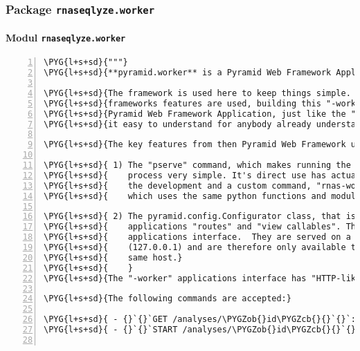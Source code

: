 \subsubsection{Package \texttt{rnaseqlyze.worker}}
\label{rnaseqlyze-pdf:package-rnaseqlyze-worker}

\paragraph{Modul \texttt{rnaseqlyze.worker}}
\label{rnaseqlyze-pdf:modul-rnaseqlyze-worker}
\begin{Verbatim}[commandchars=\\\{\},numbers=left,firstnumber=1,stepnumber=5]
\PYG{l+s+sd}{"""}
\PYG{l+s+sd}{**pyramid.worker** is a Pyramid Web Framework Application.}

\PYG{l+s+sd}{The framework is used here to keep things simple. Even thought not many of the}
\PYG{l+s+sd}{frameworks features are used, building this "-worker" part of the project as a}
\PYG{l+s+sd}{Pyramid Web Framework Application, just like the "-web" part, hopefullly makes}
\PYG{l+s+sd}{it easy to understand for anybody already understanding the "-web" part.}

\PYG{l+s+sd}{The key features from then Pyramid Web Framework used here, are}

\PYG{l+s+sd}{ 1) The "pserve" command, which makes running the application as a unix daemon}
\PYG{l+s+sd}{    process very simple. It's direct use has actually been depreciated during}
\PYG{l+s+sd}{    the development and a custom command, "rnas-worker", has been created,}
\PYG{l+s+sd}{    which uses the same python functions and modules like "pserve".}

\PYG{l+s+sd}{ 2) The pyramid.config.Configurator class, that is used to define the}
\PYG{l+s+sd}{    applications "routes" and "view callables". These "views" provide the}
\PYG{l+s+sd}{    applications interface.  They are served on a tcp port bound to localhost}
\PYG{l+s+sd}{    (127.0.0.1) and are therefore only available to processes running on the}
\PYG{l+s+sd}{    same host.}
\PYG{l+s+sd}{    }
\PYG{l+s+sd}{The "-worker" applications interface has "HTTP-like" semantics.}

\PYG{l+s+sd}{The following commands are accepted:}

\PYG{l+s+sd}{ - {}`{}`GET /analyses/\PYGZob{}id\PYGZcb{}{}`{}`:      Show the current status.}
\PYG{l+s+sd}{ - {}`{}`START /analyses/\PYGZob{}id\PYGZcb{}{}`{}`:    Start processing an analysis.}


\end{Verbatim}
